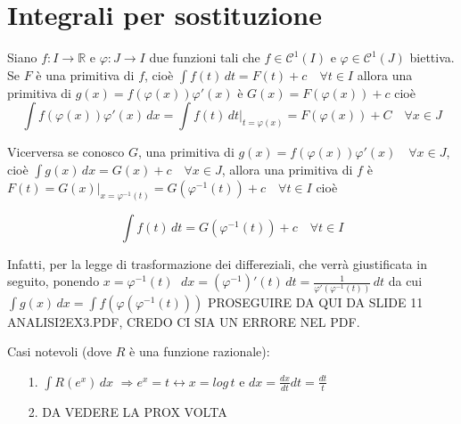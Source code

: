 \documentclass{article}
\theoremstyle{definition}
\theoremstyle{definition}
\theoremstyle{definition}
\theoremstyle{definition}
\theoremstyle{definition}
\begin{document}
\newpage
\section{Integrali per sostituzione}

Siano $f:I\rightarrow\mathbb{R}$ e $\varphi:J\rightarrow I$ due funzioni tali che $f\in\mathcal{C}^1(I)$ e $\varphi\in\mathcal{C}^1(J)$ biettiva. Se $F$ è una primitiva di $f$, cioè $\displaystyle{\int f(t)\,dt=F(t)+c \quad \forall t\in I}$ allora una primitiva di $g(x)=f(\varphi(x))\varphi'(x)$ è $G(x)=F(\varphi(x))+c$ cioè
\[\int f(\varphi(x))\varphi'(x)\,dx = \int f(t)\,dt\bigg|_{t=\varphi(x)}=F(\varphi(x))+C \quad \forall x\in J\]

Vicerversa se conosco $G$, una primitiva di $g(x)=f(\varphi(x))\varphi'(x) \quad \forall x\in J$, cioè $\int g(x)\,dx=G(x)+c \quad \forall x \in J$, allora una primitiva di $f$ è $F(t)=G(x)\bigg|_{x=\varphi^{-1}(t)}=G(\varphi^{-1}(t))+c \quad \forall t \in I$ cioè

\[\int f(t)\,dt=G(\varphi^{-1}(t))+c \quad \forall t\in I\]

Infatti, per la legge di trasformazione dei differeziali, che verrà giustificata in seguito, ponendo $x=\varphi^{-1}(t)$ $\displaystyle{\;dx=(\varphi^{-1})'(t)\,dt=\frac{1}{\varphi'(\varphi^{-1}(t))}\,dt}$ da cui $\int g(x)\,dx=\int f(\varphi(\varphi^{-1}(t)))$ PROSEGUIRE DA QUI DA SLIDE 11 ANALISI2EX3.PDF, CREDO CI SIA UN ERRORE NEL PDF.

\vspace{3mm}

Casi notevoli (dove $R$ è una funzione razionale):
\begin{itemize}
    \item [1.] $\displaystyle{\int R(e^x)\,dx}$ $\Longrightarrow e^x=t \longleftrightarrow x=log\,t$ e $\displaystyle{dx=\frac{dx}{dt}dt}=\frac{dt}{t}$
    \item [2.] DA VEDERE LA PROX VOLTA
\end{itemize}
















\end{document}
